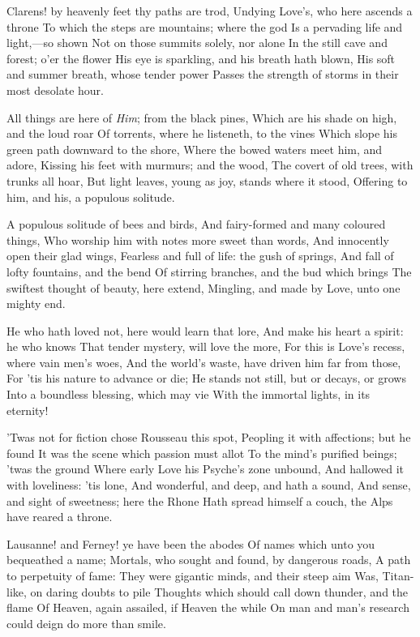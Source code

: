 \documentclass[10pt,twocolumn]{book}
\begin{document}
   Clarens! by heavenly feet thy paths are trod,\textemdash
   Undying Love's, who here ascends a throne
   To which the steps are mountains; where the god
   Is a pervading life and light,---so shown
   Not on those summits solely, nor alone
   In the still cave and forest; o'er the flower
   His eye is sparkling, and his breath hath blown,
   His soft and summer breath, whose tender power
Passes the strength of storms in their most desolate hour.


   All things are here of \textit{Him}; from the black pines,
   Which are his shade on high, and the loud roar
   Of torrents, where he listeneth, to the vines
   Which slope his green path downward to the shore,
   Where the bowed waters meet him, and adore,
   Kissing his feet with murmurs; and the wood,
   The covert of old trees, with trunks all hoar,
   But light leaves, young as joy, stands where it stood,
Offering to him, and his, a populous solitude.


   A populous solitude of bees and birds,
   And fairy-formed and many coloured things,
   Who worship him with notes more sweet than words,
   And innocently open their glad wings,
   Fearless and full of life:  the gush of springs,
   And fall of lofty fountains, and the bend
   Of stirring branches, and the bud which brings
   The swiftest thought of beauty, here extend,
Mingling, and made by Love, unto one mighty end.


   He who hath loved not, here would learn that lore,
   And make his heart a spirit:  he who knows
   That tender mystery, will love the more,
   For this is Love's recess, where vain men's woes,
   And the world's waste, have driven him far from those,
   For 'tis his nature to advance or die;
   He stands not still, but or decays, or grows
   Into a boundless blessing, which may vie
With the immortal lights, in its eternity!


   'Twas not for fiction chose Rousseau this spot,
   Peopling it with affections; but he found
   It was the scene which passion must allot
   To the mind's purified beings; 'twas the ground
   Where early Love his Psyche's zone unbound,
   And hallowed it with loveliness:  'tis lone,
   And wonderful, and deep, and hath a sound,
   And sense, and sight of sweetness; here the Rhone
Hath spread himself a couch, the Alps have reared a throne.


   Lausanne! and Ferney! ye have been the abodes
   Of names which unto you bequeathed a name;
   Mortals, who sought and found, by dangerous roads,
   A path to perpetuity of fame:
   They were gigantic minds, and their steep aim
   Was, Titan-like, on daring doubts to pile
   Thoughts which should call down thunder, and the flame
   Of Heaven, again assailed, if Heaven the while
On man and man's research could deign do more than smile.
\end{document}
